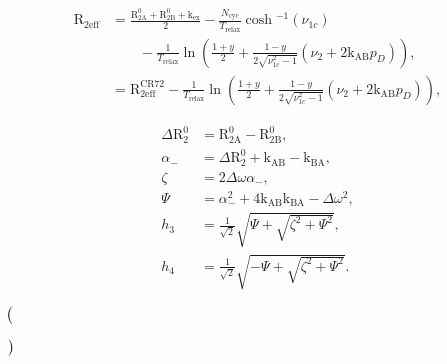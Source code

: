\documentclass[a4paper,11pt,twoside,openright]{book}
\def\lthtmlcheckvsize{\ifdim\ht\sizebox<\vsize 
  \ifdim\wd\sizebox<\hsize\expandafter\hfill\fi \expandafter\vfill
  \else\expandafter\vss\fi}%
\begin{document}
{\newpage\clearpage
\setcounter{equation}{35}
%
\begin{subequations}\begin{align}
\mathrm{R}_{\textrm{2eff}}& = \frac{\mathrm{R}_{\mathrm{2A}}^0+ \mathrm{R}_{\mathrm{2B}}^0+ \textrm{k}_{\textrm{ex}}}{2}-\frac{N_{\textrm{cyc}}}{T_{\textrm{relax}}} \cosh{}^{-1}(\nu_{1c})  \\
& \qquad - \frac{1}{T_{\textrm{relax}}}\ln{\left(\frac{1+y}{2} + \frac{1-y}{2\sqrt{\nu_{1c}^2-1}}(\nu_2 + 2\textrm{k}_{\textrm{AB}}p_D)\right)} , \\
& = \mathrm{R}_{\textrm{2eff}}^{\textrm{CR72}}- \frac{1}{T_{\textrm{relax}}}\ln{\left(\frac{1+y}{2} + \frac{1-y}{2\sqrt{\nu_{1c}^2-1}}(\nu_2 + 2\textrm{k}_{\textrm{AB}}p_D)\right)} ,
\end{align}\end{subequations}%
\lthtmldisplayZ
\lthtmlcheckvsize\clearpage}

{\newpage\clearpage
\setcounter{equation}{36}
%
\begin{subequations}\begin{align}
\Delta \mathrm{R}_2^0& = \mathrm{R}_{\mathrm{2A}}^0- \mathrm{R}_{\mathrm{2B}}^0, \\
\alpha_- & = \Delta \mathrm{R}_2^0+ \textrm{k}_{\textrm{AB}}- \textrm{k}_{\textrm{BA}}, \\
\zeta & = 2 \Delta\omega \alpha_- , \\
\Psi & = \alpha_-^2 + 4 \textrm{k}_{\textrm{AB}}\textrm{k}_{\textrm{BA}}- \Delta\omega ^2 , \\
h_3 &= \frac{1}{\sqrt{2}}\sqrt{\Psi + \sqrt{\zeta^2 + \Psi^2} } , \\
h_4 &= \frac{1}{\sqrt{2}}\sqrt{-\Psi + \sqrt{\zeta^2 + \Psi^2} } .
\end{align}\end{subequations}%
\lthtmldisplayZ
\lthtmlcheckvsize\clearpage}

{\newpage\clearpage
{}%
$\displaystyle \left(\vphantom{\mathrm{R}_{\mathrm{2A}}^0+ \mathrm{R}_{\mathrm{2B}}^0+ \textrm{k}_{\textrm{ex}}}\right.$%
\lthtmlindisplaymathZ
\lthtmlcheckvsize\clearpage}

{\newpage\clearpage
{}%
$\displaystyle \left.\vphantom{\mathrm{R}_{\mathrm{2A}}^0+ \mathrm{R}_{\mathrm{2B}}^0+ \textrm{k}_{\textrm{ex}}}\right)$%
\lthtmlindisplaymathZ
\lthtmlcheckvsize\clearpage}
\end{document}
